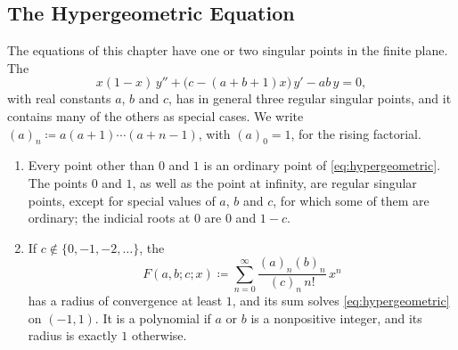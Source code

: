\subsection{The Hypergeometric Equation}

The equations of this chapter have one or two singular points in the finite plane. The 
\begin{equation}
x(1-x)\,y''+\bigl(c-(a+b+1)x\bigr)\,y'-ab\,y=0 ,
\label{eq:hypergeometric}
\end{equation}
with real constants $a$, $b$ and $c$, has in general three regular singular points, and it contains many of the others as special cases. We write $(a)_n\coloneqq a(a+1)\cdots(a+n-1)$, with $(a)_0=1$, for the rising factorial.

\begin{theorem}
\label{thm:hypergeometric}
\leavevmode
\begin{enumerate}
\item Every point other than $0$ and $1$ is an ordinary point of \eqref{eq:hypergeometric}. The points $0$ and $1$, as well as the point at infinity, are regular singular points, except for special values of $a$, $b$ and $c$, for which some of them are ordinary; the indicial roots at $0$ are $0$ and $1-c$.
\item If $c\notin\{0,-1,-2,\ldots\}$, the 
\[
F(a,b;c;x)\coloneqq\sum_{n=0}^\infty\frac{(a)_n(b)_n}{(c)_n\,n!}\,x^n
\]
has a radius of convergence at least $1$, and its sum solves \eqref{eq:hypergeometric} on $(-1,1)$. It is a polynomial if $a$ or $b$ is a nonpositive integer, and its radius is exactly $1$ otherwise.
\end{enumerate}
\end{theorem}

